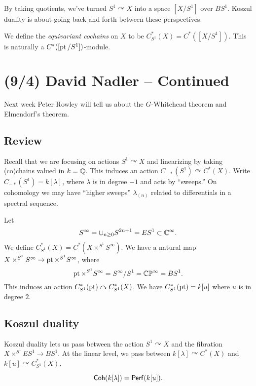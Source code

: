 \documentclass{article}
\begin{document}
By taking quotients, we've turned $S^1 \curvearrowright X$ into a space $[X / S^1]$ over $BS^1$.
Koszul duality is about going back and forth between these perspectives.

\begin{dfn}
  We define the \emph{equivariant cochains} on $X$ to be $C^*_{S^1}(X) = C^*([X / S^1])$.
  This is naturally a $C^*([\operatorname{pt} / S^1])$-module.
\end{dfn}

\section{(9/4) David Nadler -- Continued}

Next week Peter Rowley will tell us about the $G$-Whitehead theorem and Elmendorf's theorem.

\subsection{Review}

Recall that we are focusing on actions $S^1 \curvearrowright X$ and linearizing by taking (co)chains valued in $k = \mathbb{Q}$.
This induces an action $C_{-*}(S^1) \curvearrowright C^*(X)$.
Write $C_{-*}(S^1) = k[\lambda]$, where $\lambda$ is in degree $-1$ and acts by ``sweeps.''
On cohomology we may have ``higher sweeps'' $\lambda_{(n)}$ related to differentials in a spectral sequence.

Let
\[
  S^\infty = \cup_{n \geq 0} S^{2n+1} = ES^1 \subset \mathbb{C}^\infty.
\]
We define $C^*_{S^1}(X) = C^*(X \times^{S^1} S^\infty)$.
We have a natural map $X \times^{S^1} S^\infty \to \operatorname{pt} \times^{S^1} S^\infty$, where
\[
  \operatorname{pt} \times^{S^1} S^\infty = S^\infty / S^1 = \mathbb{C}\mathbb{P}^\infty = BS^1.
\]
This induces an action $C^*_{S^1}(\operatorname{pt}) \curvearrowright C^*_{S^1}(X)$.
We have $C^*_{S^1}(\operatorname{pt}) = k[u]$ where $u$ is in degree $2$.

\subsection{Koszul duality}

Koszul duality lets us pass between the action $S^1 \curvearrowright X$ and the fibration $X \times^{S^1} ES^1 \to BS^1$.
At the linear level, we pass between $k[\lambda] \curvearrowright C^*(X)$ and $k[u] \curvearrowright C^*_{S^1}(X)$.

\begin{thm}
  \[
    \mathsf{Coh}(k[\lambda]) = \mathsf{Perf}(k[u]).
  \]
\end{thm}
\end{document}
